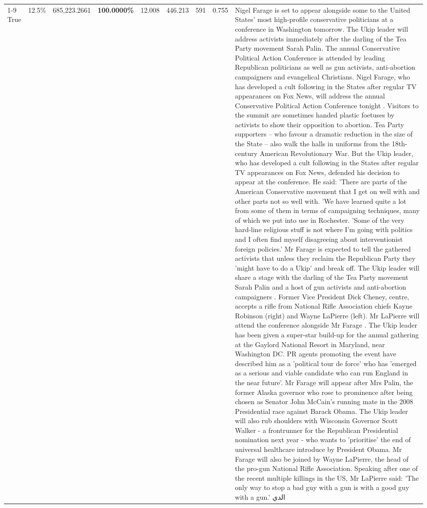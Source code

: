 \begin{table}[H]
\begin{tabular}{lllrlllll}
\cline{1-9}
True & 12.5\% & 685,223.2661 & \bfseries \color{red} 100.0000\% & 12.008 & 446.213 & 591 & 0.755 & Nigel Farage is set to appear alongside some to the United States' most high-profile conservative politicians at a conference in Washington tomorrow. The Ukip leader will address activists immediately after the darling of the Tea Party movement Sarah Palin. The annual Conservative Political Action Conference is attended by leading Republican politicians as well as gun activists, anti-abortion campaigners and evangelical Christians. Nigel Farage, who has developed a cult following in the States after regular TV appearances on Fox News, will address the annual Conservative Political Action Conference tonight . Visitors to the summit are sometimes handed plastic foetuses by activists to show their opposition to abortion. Tea Party supporters – who favour a dramatic reduction in the size of the State – also walk the halls in uniforms from the 18th-century American Revolutionary War. But the Ukip leader, who has developed a cult following in the States after regular TV appearances on Fox News, defended his decision to appear at the conference. He said: 'There are parts of the American Conservative movement that I get on well with and other parts not so well with. 'We have learned quite a lot from some of them in terms of campaigning techniques, many of which we put into use in Rochester. 'Some of the very hard-line religious stuff is not where I'm going with politics and I often find myself disagreeing about interventionist foreign policies.' Mr Farage is expected to tell the gathered activists that unless they reclaim the Republican Party they 'might have to do a Ukip' and break off. The Ukip leader will share a stage with the darling of the Tea Party movement Sarah Palin and a host of gun activists and anti-abortion campaigners . Former Vice President Dick Cheney, centre, accepts a rifle from National Rifle Association chiefs Kayne Robinson (right) and Wayne LaPierre (left). Mr LaPierre will attend the conference alongside Mr Farage . The Ukip leader has been given a super-star build-up for the annual gathering at the Gaylord National Resort in Maryland, near Washington DC. PR agents promoting the event have described him as a 'political tour de force' who has 'emerged as a serious and viable candidate who can run England in the near future'. Mr Farage will appear after Mrs Palin, the former Alaska governor who rose to prominence after being chosen as Senator John McCain's running mate in the 2008 Presidential race against Barack Obama. The Ukip leader will also rub shoulders with Wisconsin Governor Scott Walker - a frontrunner for the Republican Presidential nomination next year - who wants to 'prioritise' the end of universal healthcare introduce by President Obama. Mr Farage will also be joined by Wayne LaPierre, the head of the pro-gun National Rifle Association. Speaking after one of the recent multiple killings in the US, Mr LaPierre said: 'The only way to stop a bad guy with a gun is with a good guy with a gun.' الدي \\

\end{tabular}
\end{table}
